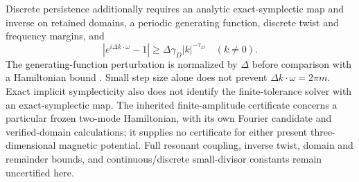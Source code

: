 Discrete persistence additionally requires an analytic exact-symplectic map and inverse on retained domains, a periodic generating function, discrete twist and frequency margins, and
\begin{equation}
 |e^{i\Delta k\cdot\omega}-1|\ge\Delta\gamma_D|k|^{-\tau_D}\quad(k\ne0).
 \label{eq:learn-discrete-divisor}
\end{equation}
The generating-function perturbation is normalized by $\Delta$ before comparison with a Hamiltonian bound \citep{Shang1999}. Small step size alone does not prevent $\Delta k\cdot\omega=2\pi m$. Exact implicit symplecticity also does not identify the finite-tolerance solver with an exact-symplectic map. The inherited finite-amplitude certificate concerns a particular frozen two-mode Hamiltonian, with its own Fourier candidate and verified-domain calculations; it supplies no certificate for either present three-dimensional magnetic potential. Full resonant coupling, inverse twist, domain and remainder bounds, and continuous/discrete small-divisor constants remain uncertified here.
